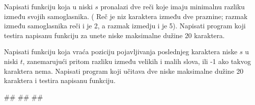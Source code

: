\begin{Exercise}[label=p2.3_] 
Napisati funkciju
 koja u niski $s$ pronalazi dve reči koje imaju minimalnu razliku između
svojih samoglasnika.  ( Reč je niz karaktera između dve praznine;
razmak između samoglasnika reči  i  je 2,
a razmak izmedju  i  je 5). Napisati program koji testira napisanu funkciju za unete niske maksimalne dužine 20 karaktera.\\
\end{Exercise}
\begin{Answer}[ref=p2.3_]
\end{Answer}


\begin{Exercise}[label=p2.3_] 
Napisati funkciju  koja vraća poziciju pojavljivanja poslednjeg karaktera niske $s$ u niski $t$, zanemarujući pritom razliku između velikih i
malih slova, ili -1 ako takvog karaktera nema. Napisati program koji učitava dve niske maksimalne dužine 20 karaktera i testira napisanu funkciju.\\
\begin{miditest}
\begin{upotreba}{1}
#\naslovInt#
##
##
\end{upotreba}
\end{miditest}
\end{Exercise}
\begin{Answer}[ref=p2.3_]
\end{Answer}




